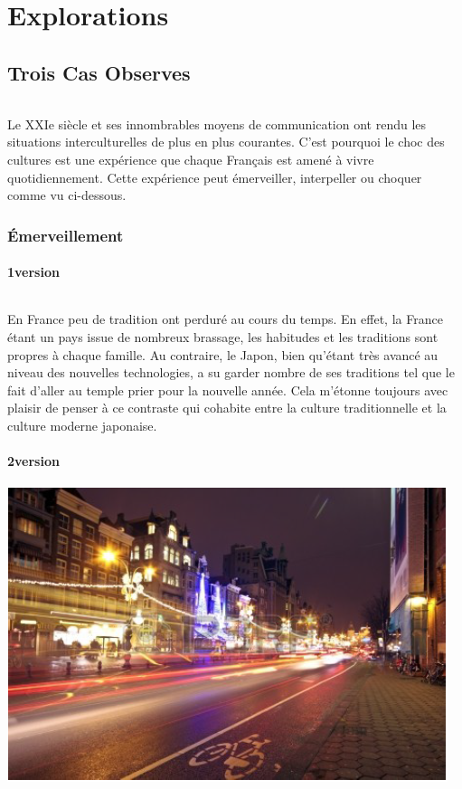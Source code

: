 \part{Explorations}
\chapter{Trois Cas Observes}

\paragraph{} Le XXIe siècle et ses innombrables moyens de communication ont
rendu les situations interculturelles de plus en plus courantes. C'est pourquoi
le choc des cultures est une expérience que chaque Français est amené à vivre
quotidiennement. Cette expérience peut émerveiller, interpeller ou choquer
comme vu ci-dessous.

\section{Émerveillement}

\subsection{1\iere version}

\paragraph{} En France peu de tradition ont perduré au cours du temps. En
effet, la France étant un pays issue de nombreux brassage, les habitudes et les
traditions sont propres à chaque famille. Au contraire, le Japon, bien qu'étant
très avancé au niveau des nouvelles technologies, a su garder nombre de ses
traditions tel que le fait d'aller au temple prier pour la nouvelle année. Cela
m'étonne toujours avec plaisir de penser à ce contraste qui cohabite entre la
culture traditionnelle et la culture moderne japonaise.

\subsection{2\ieme version}

\begin{center}
	\includegraphics[scale=0.7]{Amsterdam1.jpg}
\end{center}

